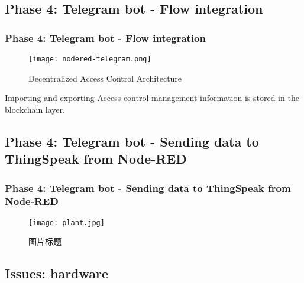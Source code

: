 \documentclass[
    aspectratio=169,                   %
]{beamer}
\begin{document}
\subsection{Phase 4: Telegram bot - Flow integration}

    \begin{frame}
     \frametitle{Phase 4: Telegram bot - Flow integration}
        \begin{figure}
            \centering
            \begin{stampbox}
                \texttt{[image: nodered-telegram.png]}
            \end{stampbox}
            \caption{Decentralized Access Control Architecture}
        \end{figure}

        \begin{block}{Importing and exporting}
            Access control management information is stored in the blockchain layer.
        \end{block}
    \end{frame}

\subsection{Phase 4: Telegram bot - Sending data to ThingSpeak from Node-RED}

    \begin{frame}
        \frametitle{Phase 4: Telegram bot - Sending data to ThingSpeak from Node-RED}
        \begin{figure}
            \centering
            \begin{stampbox}
                \texttt{[image: plant.jpg]}
            \end{stampbox}
            \caption{图片标题}
        \end{figure}
    \end{frame}

\subsection{Issues: hardware}
\end{document}
